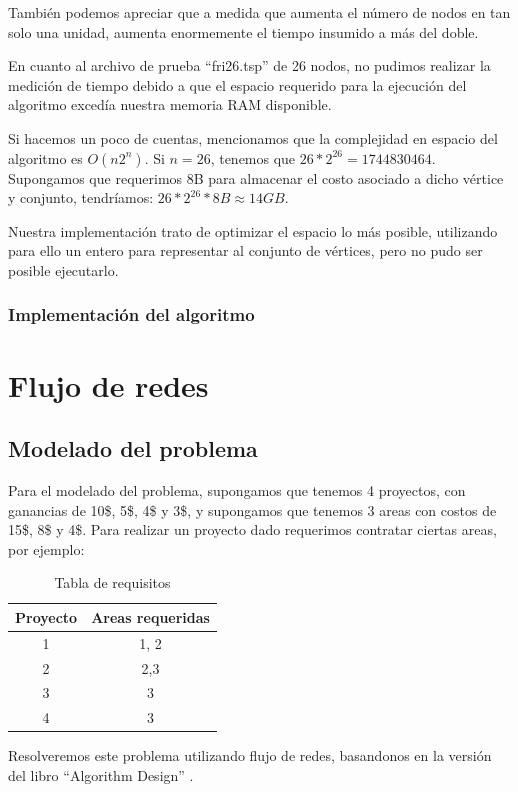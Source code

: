 También podemos apreciar que a medida que aumenta el número de nodos en tan solo una unidad, aumenta enormemente el tiempo insumido a más del doble.

En cuanto al archivo de prueba ``fri26.tsp'' de 26 nodos, no pudimos realizar la medición de tiempo debido a que el espacio requerido para la ejecución del 
algoritmo excedía nuestra memoria RAM disponible.

Si hacemos un poco de cuentas, mencionamos que la complejidad en espacio del algoritmo es $O(n 2^n)$.
Si $n = 26$, tenemos que $26 * 2^{26} = 1744830464$. Supongamos que requerimos 8B para almacenar el costo asociado a dicho vértice y conjunto, tendríamos: $26 * 2^{26} * 8B \approx 14GB$.

Nuestra implementación trato de optimizar el espacio lo más posible, utilizando para ello un entero para representar al conjunto de vértices, pero no pudo ser posible ejecutarlo.
\newpage
\subsubsection{Implementación del algoritmo}
\newpage
\section{Flujo de redes}
\subsection{Modelado del problema}
Para el modelado del problema, supongamos que tenemos 4 proyectos, con ganancias de 10\$, 5\$, 4\$ y 3\$, y supongamos que tenemos 3 areas con costos de 15\$, 8\$ y 4\$.
Para realizar un proyecto dado requerimos contratar ciertas areas, por ejemplo:
\begin{table}[H]
\centering
\begin{tabular}{|c|c|}
\hline
Proyecto & Areas requeridas \\ \hline
1        & 1, 2             \\ \hline
2        & 2,3              \\ \hline
3        & 3                \\ \hline
4        & 3                \\ \hline
\end{tabular}
\caption{Tabla de requisitos}
\end{table}

Resolveremos este problema utilizando flujo de redes, basandonos en la versión del libro ``Algorithm Design'' \cite{ALGORITHMDESIGN}.

